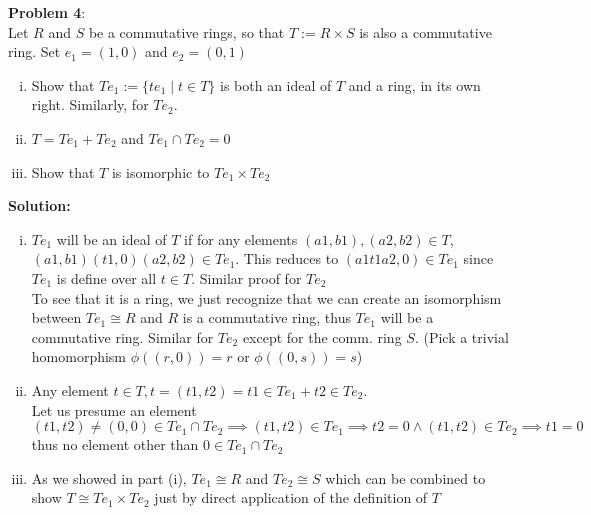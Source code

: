 \documentclass[11pt]{article}
\newcommand{\prob}[3]{\begin{flushleft}
        \textbf{Problem #1}: \\
        #2 
		\textbf{Solution:} 
		#3

\end{flushleft}}
\begin{document}
\prob{4}{
    Let $R$ and $S$ be a commutative rings, so that $T := R \times S$ is also a commutative ring. Set $e_1 = (1,0)$ and $e_2 = (0,1)$
    \begin{enumerate}[(i)]
        \item Show that $Te_1 := \{ te_1 \mid t \in T \}$ is both an ideal of $T$ and a ring, in its own right. Similarly, for $Te_2$.
        \item $T = Te_1 + Te_2$ and $Te_1 \cap Te_2 = 0$
        \item Show that $T$ is isomorphic to $Te_1 \times Te_2$
    \end{enumerate}
}{
    \begin{enumerate}[(i)]
        \item $Te_1$ will be an ideal of $T$ if for any elements $(a1,b1), (a2,b2) \in T$, $(a1,b1)(t1,0)(a2,b2) \in Te_1$. This reduces to $(a1t1a2,0) \in Te_1$ since $Te_1$ is define over all $t \in T$. Similar proof for $Te_2$ \\
              To see that it is a ring, we just recognize that we can create an isomorphism between $Te_1 \cong R$ and $R$ is a commutative ring, thus $Te_1$ will be a commutative ring. Similar for $Te_2$ except for the comm. ring $S$. (Pick a trivial homomorphism $\phi((r,0)) = r$ or $\phi((0,s)) = s$)

        \item Any element $t \in T, t = (t1,t2) = t1 \in Te_1 + t2 \in Te_2$. \\
              Let us presume an element $(t1,t2) \neq (0,0) \in Te_1 \cap Te_2 \implies (t1,t2) \in Te_1 \implies t2 = 0 \land (t1,t2) \in Te_2 \implies t1 = 0$ thus no element other than $0 \in Te_1 \cap Te_2$

        \item As we showed in part (i), $Te_1 \cong R$ and $Te_2 \cong S$ which can be combined to show $T \cong Te_1 \times Te_2$ just by direct application of the definition of $T$
    \end{enumerate}
}
\end{document}
